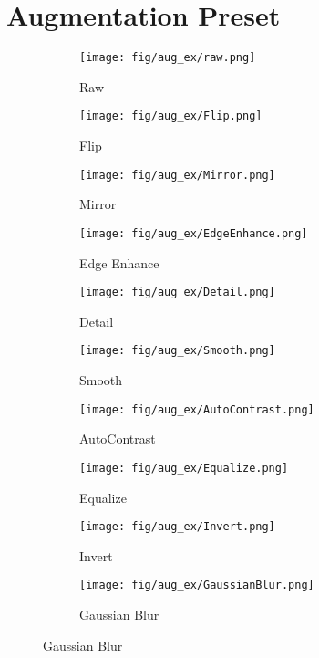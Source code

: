 \documentclass{article}
\begin{document}
\section{Augmentation Preset}
\label{app:augmentation}
\begin{figure}[!t]
  \centering
  \begin{subfigure}[b]{0.16\linewidth}
      \texttt{[image: fig/aug\_ex/raw.png]}
      \caption{Raw}
  \end{subfigure}
  \begin{subfigure}[b]{0.16\linewidth}
          \texttt{[image: fig/aug\_ex/Flip.png]}
          \caption{Flip}
  \end{subfigure}
  \begin{subfigure}[b]{0.16\linewidth}
          \texttt{[image: fig/aug\_ex/Mirror.png]}
          \caption{Mirror}
  \end{subfigure}
  \begin{subfigure}[b]{0.16\linewidth}
          \texttt{[image: fig/aug\_ex/EdgeEnhance.png]}
          \caption{Edge Enhance}
  \end{subfigure}
  \begin{subfigure}[b]{0.16\linewidth}
          \texttt{[image: fig/aug\_ex/Detail.png]}
          \caption{Detail}
  \end{subfigure}
  \begin{subfigure}[b]{0.16\linewidth}
          \texttt{[image: fig/aug\_ex/Smooth.png]}
          \caption{Smooth}
  \end{subfigure}
  \begin{subfigure}[b]{0.16\linewidth}
          \texttt{[image: fig/aug\_ex/AutoContrast.png]}
          \caption{AutoContrast}
  \end{subfigure}
  \begin{subfigure}[b]{0.16\linewidth}
          \texttt{[image: fig/aug\_ex/Equalize.png]}
          \caption{Equalize}
  \end{subfigure}
  \begin{subfigure}[b]{0.16\linewidth}
          \texttt{[image: fig/aug\_ex/Invert.png]}
          \caption{Invert}
  \end{subfigure}
  \begin{subfigure}[b]{0.16\linewidth}
          \texttt{[image: fig/aug\_ex/GaussianBlur.png]}
          \caption{Gaussian Blur}
  \end{subfigure}

\end{figure}
\end{document}
